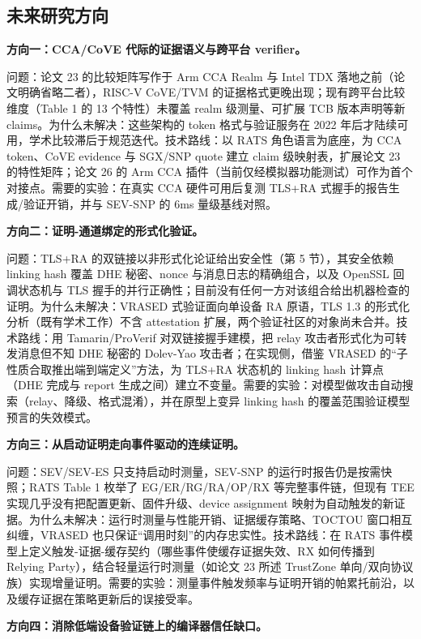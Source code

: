\documentclass[11pt]{ctexart}
\begin{document}
\subsection{未来研究方向}
\noindent\textbf{方向一：CCA/CoVE 代际的证据语义与跨平台 verifier。}\par
问题：论文 23 的比较矩阵写作于 Arm CCA Realm 与 Intel TDX 落地之前（论文明确省略二者），RISC-V CoVE/TVM 的证据格式更晚出现；现有跨平台比较维度（Table 1 的 13 个特性）未覆盖 realm 级测量、可扩展 TCB 版本声明等新 claims。为什么未解决：这些架构的 token 格式与验证服务在 2022 年后才陆续可用，学术比较滞后于规范迭代。技术路线：以 RATS 角色语言为底座，为 CCA token、CoVE evidence 与 SGX/SNP quote 建立 claim 级映射表，扩展论文 23 的特性矩阵；论文 26 的 Arm CCA 插件（当前仅经模拟器功能测试）可作为首个对接点。需要的实验：在真实 CCA 硬件可用后复测 TLS+RA 式握手的报告生成/验证开销，并与 SEV-SNP 的 6ms 量级基线对照。\par
\noindent\textbf{方向二：证明-通道绑定的形式化验证。}\par
问题：TLS+RA 的双链接以非形式化论证给出安全性（第 5 节），其安全依赖 linking hash 覆盖 DHE 秘密、nonce 与消息日志的精确组合，以及 OpenSSL 回调状态机与 TLS 握手的并行正确性；目前没有任何一方对该组合给出机器检查的证明。为什么未解决：VRASED 式验证面向单设备 RA 原语\cite{nunes2019vrased}，TLS 1.3 的形式化分析（既有学术工作）不含 attestation 扩展，两个验证社区的对象尚未合并。技术路线：用 Tamarin/ProVerif 对双链接握手建模，把 relay 攻击者形式化为可转发消息但不知 DHE 秘密的 Dolev-Yao 攻击者；在实现侧，借鉴 VRASED 的“子性质合取推出端到端定义”方法，为 TLS+RA 状态机的 linking hash 计算点（DHE 完成与 report 生成之间）建立不变量。需要的实验：对模型做攻击自动搜索（relay、降级、格式混淆），并在原型上变异 linking hash 的覆盖范围验证模型预言的失效模式。\par
\noindent\textbf{方向三：从启动证明走向事件驱动的连续证明。}\par
问题：SEV/SEV-ES 只支持启动时测量，SEV-SNP 的运行时报告仍是按需快照；RATS Table 1 枚举了 EG/ER/RG/RA/OP/RX 等完整事件链，但现有 TEE 实现几乎没有把配置更新、固件升级、device assignment 映射为自动触发的新证据。为什么未解决：运行时测量与性能开销、证据缓存策略、TOCTOU 窗口相互纠缠，VRASED 也只保证“调用时刻”的内存忠实性。技术路线：在 RATS 事件模型上定义触发-证据-缓存契约（哪些事件使缓存证据失效、RX 如何传播到 Relying Party），结合轻量运行时测量（如论文 23 所述 TrustZone 单向/双向协议族）实现增量证明。需要的实验：测量事件触发频率与证明开销的帕累托前沿，以及缓存证据在策略更新后的误接受率。\par
\noindent\textbf{方向四：消除低端设备验证链上的编译器信任缺口。}\par
\end{document}
